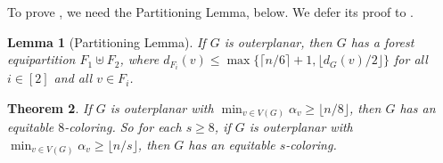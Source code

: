 \documentclass[11pt]{article}
\newtheorem{lem}{Lemma}
\newtheorem{thm}[lem]{Theorem}
\theoremstyle{definition}
\newcommand\floor[1]{\lfloor#1\rfloor}
\newcommand\ceil[1]{\lceil#1\rceil}
\renewcommand\ge\geqslant
\renewcommand\le\leqslant
\begin{document}
	To prove , we need the Partitioning Lemma, below.  We defer its proof to .

\begin{lem}[Partitioning Lemma]
	If $G$ is outerplanar, then $G$ has a forest equipartition $F_1\uplus F_2$, where 
	$d_{F_i}(v)\le \max\{\ceil{n/6}+1,\floor{d_G(v)/2}\}$ for all $i\in[2]$ and all $v\in F_i$.
\end{lem}

\begin{thm}
	If $G$ is outerplanar with $\min_{v\in V(G)} \alpha_v \ge \floor{n/8}$, then $G$ has an equitable $8$-coloring.  So for each $s\ge 8$,
	if $G$ is outerplanar with $\min_{v\in V(G)} \alpha_v \ge \floor{n/s}$, then $G$ has an equitable $s$-coloring.
	\label{main-thm-8}
\end{thm}
\end{document}
